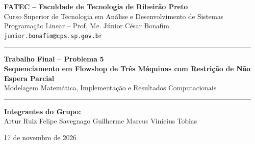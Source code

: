 \documentclass[11pt,a4paper]{article}
\begin{document}
\begin{center}
    {\large \textbf{FATEC -- Faculdade de Tecnologia de Ribeirão Preto}}\\[0.2em]
    {\normalsize Curso Superior de Tecnologia em Análise e Desenvolvimento de Sistemas}\\[0.2em]
    {\normalsize Programação Linear -- Prof. Me. Júnior César Bonafim}\\[0.3em]
    {\small \texttt{junior.bonafim@cps.sp.gov.br}}\\[1.0em]
    \hrule
    \vspace{0.7em}
    {\LARGE \textbf{Trabalho Final -- Problema 5}}\\[0.3em]
    {\Large \textbf{Sequenciamento em Flowshop de Três Máquinas com Restrição de Não Espera Parcial}}\\[0.3em]
    {\normalsize Modelagem Matemática, Implementação e Resultados Computacionais}
    \vspace{0.7em}
    \hrule
    \vspace{0.9em}

    \textbf{Integrantes do Grupo:}\\[0.3em]
    Artur Ruiz \quad\textbar\quad 
    Felipe Savegnago \quad\textbar\quad 
    Guilherme \quad\textbar\quad 
    Marcus Vinícius \quad\textbar\quad 
    Tobias

    \vspace{0.5em}
    {\small 17 de novembro de 2026}
\end{center}

\vspace{0.5em}

\begin{abstract}
\noindent Este trabalho apresenta a modelagem matemática e a resolução computacional do Problema 5 da disciplina de Programação Linear. O problema consiste em programar um conjunto de tarefas em um ambiente \textit{flowshop} de três máquinas com restrição de ausência de espera (\textit{no-wait}) entre as máquinas 1 e 2, e espera permitida antes da máquina 3, buscando minimizar o tempo total de execução (\textit{makespan}, $C_{\max}$). O problema é classificado como $F3 \mid \text{no-wait}(M_1 \to M_2),\, \text{prmu} \mid C_{\max}$. Demonstrou-se que a busca pode ser restrita a soluções permutacionais sem perda de otimalidade. Desenvolveu-se um modelo de programação linear inteira mista (PLIM) posicional, evitando o uso de constantes \textit{big-M}. O modelo foi validado com instâncias didáticas de 3 e 4 tarefas (com enumeração completa e gráfico de Gantt) e com 30 instâncias aleatórias. A implementação em Python foi testada nas seis instâncias oficiais da disciplina (de 6 a 20 tarefas), com limite de tempo de 3600 segundos por instância. Todas as instâncias foram resolvidas até a otimalidade comprovada (gap de $0{,}0\%$), com tempo médio de $0{,}885$ segundo e tempo máximo de $2{,}308$ segundos para a maior instância.
\end{abstract}
\end{document}

